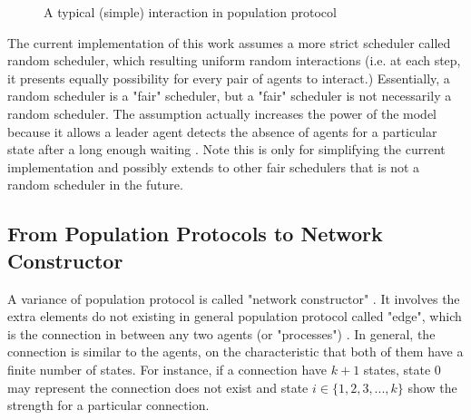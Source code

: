 \begin{figure}[H]
\begin{center}
\end{center}
\caption{A typical (simple) interaction in population protocol}
\end{figure}



\par\noindent
The current implementation of this work assumes a more strict scheduler called random scheduler,
which resulting uniform random interactions (i.e. at each step, it presents
equally possibility for every pair of agents to interact.) Essentially, a random scheduler is a "fair" scheduler, but a "fair" scheduler is not necessarily a random scheduler.
The assumption actually increases the power of the model because it allows a leader agent detects the absence
of agents for a particular state after a long enough waiting \cite{AspnesR2007}. Note this is only for
simplifying the current implementation and possibly extends to other fair schedulers that is not a
random scheduler in the future.

\subsection{From Population Protocols to Network Constructor \cite{MS16a}}

\par\noindent
A variance of population protocol is called "network constructor" \cite{MS16a}.
It involves the extra elements do not existing in general population protocol called "edge", which is
the connection in between any two agents (or "processes") \cite{MS16a}. In general, the connection
is similar to the agents, on the characteristic that both of them have a finite number of states. For instance, if
a connection have $k + 1$ states,  state 0 may represent the connection does not exist and state $i \in \{1,2,3, ..., k\}$
show the strength for a particular connection.


